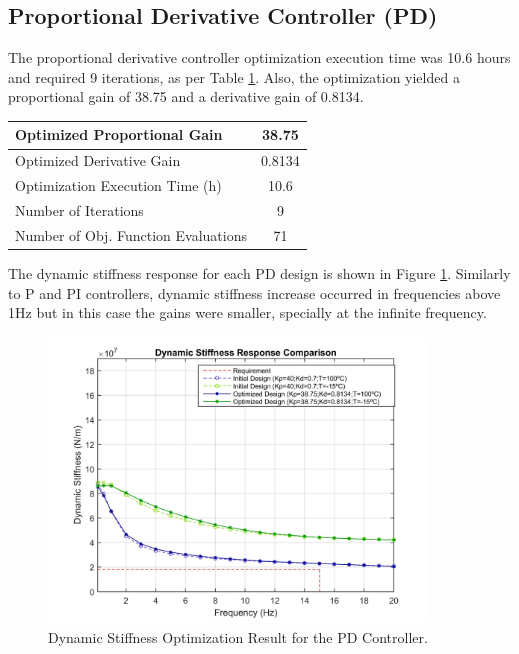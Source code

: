 \subsection{Proportional Derivative Controller (PD)}

The proportional derivative controller optimization execution time was 10.6 hours and required 9 iterations, as per Table \ref{table:5_2_3_PDContExecution}. Also, the optimization yielded a proportional gain of 38.75 and a derivative gain of 0.8134.

\begin{table}[H]
	\label{table:5_2_3_PDContExecution}
	\centering
	\resizebox{7cm}{!} {
		\begin{tabular}{|l|c|}
			\hline
			Optimized Proportional Gain & 38.75 \\ \hline
			Optimized Derivative Gain & 0.8134 \\ \hline
			Optimization Execution Time (h) & 10.6 \\ \hline
			Number of Iterations & 9 \\ \hline
			Number of Obj. Function Evaluations & 71 \\ \hline			
	\end{tabular}}
\end{table}

The  dynamic stiffness response for each PD design is shown in Figure \ref{fig:5_2_3_PD_DynStif}. Similarly to P and PI controllers, dynamic stiffness increase occurred in frequencies above 1Hz but in this case the gains were smaller, specially at the infinite frequency. 

\begin{figure}[H]
	\centering
	\centerline{\includegraphics[width=0.9\textwidth]{Figuras/5.OptimizationResults/5-2-3-PD-DynamicStiffnessComparison.jpg}}
	\caption{Dynamic Stiffness Optimization Result for the PD Controller.}
	\label{fig:5_2_3_PD_DynStif}
\end{figure}

